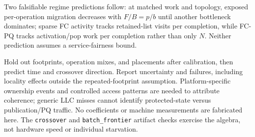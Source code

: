 Two falsifiable regime predictions follow: at matched work and topology,
exposed per-operation migration decreases with $F/B=p/b$ until another
bottleneck dominates; sparse FC activity tracks retained-list visits per
completion, while FC-PQ tracks activation/pop work per completion rather than
only $N$. Neither prediction assumes a service-fairness bound.

Hold out footprints, operation mixes, and placements after calibration, then
predict time and crossover direction. Report uncertainty and failures,
including locality effects outside the repeated-footprint assumption.
Platform-specific ownership events and controlled access patterns are needed
to attribute coherence; generic LLC misses cannot identify protected-state
versus publication/PQ traffic. No coefficients or machine measurements are
fabricated here. The \texttt{crossover} and \texttt{batch\_frontier} artifact
checks exercise the algebra, not hardware speed or individual starvation.
